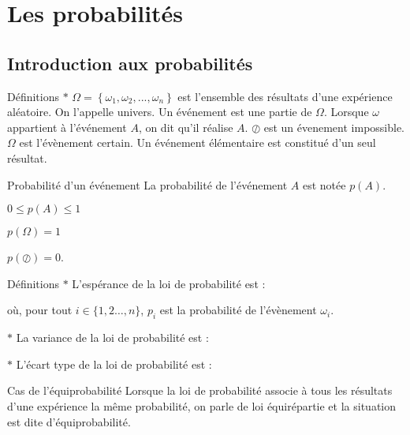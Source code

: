 \section{Les probabilités}
\subsection{Introduction aux probabilités}
\begin{bclogo}{Définitions}
$\ast$ $\Omega = \left\lbrace \omega _{1}, \omega _{2},..., \omega _{n}\right\rbrace $ est l'ensemble des résultats d'une expérience aléatoire. On l'appelle univers. Un événement est une partie de $\Omega$. Lorsque $\omega$ appartient à l'événement $A$, on dit qu'il réalise $A$. $\oslash$ est un évenement impossible. $\Omega$ est l'évènement certain. Un événement élémentaire est constitué d'un seul résultat.
\end{bclogo}

\medskip

\begin{bclogo}{Probabilité d'un événement}
La probabilité de l'événement $A$ est notée $p(A)$. 

$0\leqslant p(A)\leqslant1$

$p(\Omega )=1$

$p(\oslash )=0$.
\end{bclogo}

\medskip

\begin{bclogo}{Définitions}
$\ast$ L'espérance de la loi de probabilité est : 

où, pour tout $i\in\{1,2\ldots,n\}$, $p_i$ est la probabilité de l'évènement $\omega_i$.

$\ast$ La variance de la loi de probabilité est : 

$\ast$ L'écart type de la loi de probabilité est : 
\end{bclogo}

\medskip



\medskip

\begin{bclogo}{Cas de l'équiprobabilité}
Lorsque la loi de probabilité associe à tous les résultats d'une expérience la même probabilité, on parle de loi équirépartie et la situation est dite d'équiprobabilité.
\end{bclogo}

